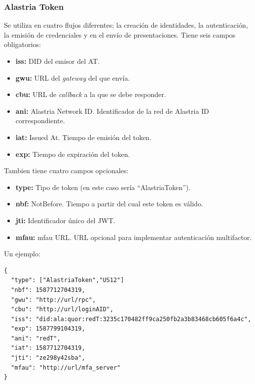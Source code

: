 \subsubsection*{Alastria Token}
Se utiliza en cuatro flujos diferentes; la creación de identidades, la autenticación, la emisión de credenciales y en el envío de presentaciones.
Tiene seis campos obligatorios:
\begin{itemize}
    \item \textbf{iss:} DID del emisor del AT.
    \item \textbf{gwu:} URL del \textit{gateway} del que envía.
    \item \textbf{cbu:} URL de \textit{callback} a la que se debe responder.
    \item \textbf{ani:} Alastria Network ID. Identificador de la red de Alastria ID correspondiente.
    \item \textbf{iat:} Issued At. Tiempo de emisión del token.
    \item \textbf{exp:} Tiempo de expiración del token.
\end{itemize}
Tambien tiene cuatro campos opcionales:
\begin{itemize}
    \item \textbf{type:} Tipo de token (en este caso sería ``AlastriaToken'').
    \item \textbf{nbf:} NotBefore. Tiempo a partir del cual este token es válido.
    \item \textbf{jti:} Identificador único del JWT.
    \item \textbf{mfau:} \acrshort{mfau} URL. URL opcional para implementar autenticación multifactor.
\end{itemize}
Un ejemplo:
\begin{verbatim}
{
  "type": ["AlastriaToken","US12"]
  "nbf": 1587712704319,
  "gwu": "http://url/rpc",
  "cbu": "http://url/loginAID",
  "iss": "did:ala:quor:redT:3235c170482ff9ca250fb2a3b83468cb605f6a4c",
  "exp": 1587799104319,
  "ani": "redT",
  "iat": 1587712704319,
  "jti": "ze298y42sba",
  "mfau": "http://url/mfa_server"
}
\end{verbatim}
